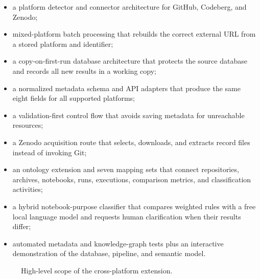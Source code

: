 \begin{itemize}
  \item a platform detector and connector architecture for GitHub, Codeberg, and Zenodo;
  \item mixed-platform batch processing that rebuilds the correct external URL from a stored platform and identifier;
  \item a copy-on-first-run database architecture that protects the source database and records all new results in a working copy;
  \item a normalized metadata schema and API adapters that produce the same eight fields for all supported platforms;
  \item a validation-first control flow that avoids saving metadata for unreachable resources;
  \item a Zenodo acquisition route that selects, downloads, and extracts record files instead of invoking Git;
  \item an ontology extension and seven mapping sets that connect repositories, archives, notebooks, runs, executions, comparison metrics, and classification activities;
  \item a hybrid notebook-purpose classifier that compares weighted rules with a free local language model and requests human clarification when their results differ;
  \item automated metadata and knowledge-graph tests plus an interactive demonstration of the database, pipeline, and semantic model.
\end{itemize}

\begin{figure}[ht]
\centering
{}
\caption{High-level scope of the cross-platform extension.}
\label{fig:scope}
\end{figure}

